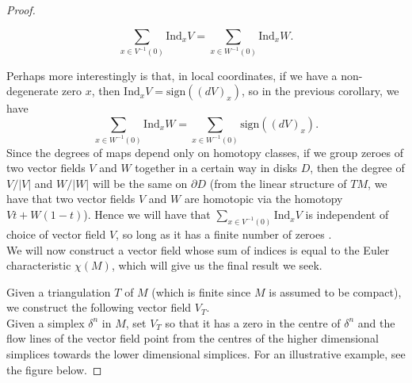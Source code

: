 \documentclass[12pt,a4paper]{article}
\begin{document}
\begin{proof}
\begin{corollary}
\[
\sum_{x\in V^{-1}(0)}\mathrm{Ind}_xV=\sum_{x\in W^{-1}(0)}\mathrm{Ind}_xW.
\]
\end{corollary}
Perhaps more interestingly is that, in local coordinates, if we have a non-degenerate zero $x$, then $\mathrm{Ind}_xV=\mathrm{sign}((dV)_x)$, so in the previous corollary, we have
\[
\sum_{x\in W^{-1}(0)}\mathrm{Ind}_xW=\sum_{x\in W^{-1}(0)}\mathrm{sign}((dV)_x).
\]
Since the degrees of maps depend only on homotopy classes, if we group zeroes of two vector fields $V$ and $W$ together in a certain way in disks $D$, then the degree of $V/|V|$ and $W/|W|$ will be the same on $\partial D$ (from the linear structure of $TM$, we have that two vector fields $V$ and $W$ are homotopic via the homotopy $Vt+W(1-t)$). Hence we will have that $\sum_{x\in V^{-1}(0)}\mathrm{Ind}_xV$ is independent of choice of vector field $V$, so long as it has a finite number of zeroes \cite{wrightPoincare, BurnsGidea}.\\

We will now construct a vector field whose sum of indices is equal to the Euler characteristic $\chi(M)$, which will give us the final result we seek.

Given a triangulation $T$ of $M$ (which is finite since $M$ is assumed to be compact), we construct the following vector field $V_T$. \\

Given a simplex $\delta^n$ in $M$, set $V_T$ so that it has a zero in the centre of $\delta^n$ and the flow lines of the vector field point from the centres of the higher dimensional simplices towards the lower dimensional simplices. For an illustrative example, see the figure below. 


\end{proof}
\end{document}
